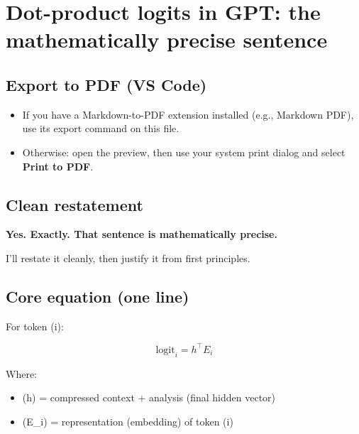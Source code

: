 \documentclass[
]{article}
\author{}
\date{}
\providecommand{\tightlist}{%
  \setlength{\itemsep}{0pt}\setlength{\parskip}{0pt}}
\begin{document}
\hypertarget{dot-product-logits-in-gpt-the-mathematically-precise-sentence}{%
\section{Dot-product logits in GPT: the mathematically precise
sentence}\label{dot-product-logits-in-gpt-the-mathematically-precise-sentence}}

\hypertarget{export-to-pdf-vs-code}{%
\subsection{Export to PDF (VS Code)}\label{export-to-pdf-vs-code}}

\begin{itemize}
\tightlist
\item
  If you have a Markdown-to-PDF extension installed (e.g., Markdown
  PDF), use its export command on this file.
\item
  Otherwise: open the preview, then use your system print dialog and
  select \textbf{Print to PDF}.
\end{itemize}

\hypertarget{clean-restatement}{%
\subsection{Clean restatement}\label{clean-restatement}}

\textbf{Yes. Exactly. That sentence is mathematically precise.}

I'll restate it cleanly, then justify it from first principles.

\pagebreak

\hypertarget{core-equation-one-line}{%
\subsection{Core equation (one line)}\label{core-equation-one-line}}

For token (i):

\[
\text{logit}_i = h^\top E_i
\]

Where:

\begin{itemize}
\tightlist
\item
  (h) = compressed context + analysis (final hidden vector)
\item
  (E\_i) = representation (embedding) of token (i)
\end{itemize}
\end{document}
